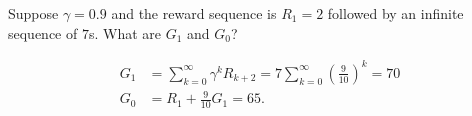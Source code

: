 
\begin{exercise}[Exercise 3.9]

Suppose $\gamma = 0.9$ and the reward sequence is $R_1 =2 $ followed by an infinite
sequence of $7$s. What are $G_1$ and $G_0$?

\end{exercise}


\begin{solution}

\begin{align*}
  G_1 &= \sum_{k=0}^{\infty}\gamma^k R_{k+2} = 7 \sum_{k=0}^{\infty}\left(\frac{9}{10}\right)^k = 70 \\
  G_0 &= R_1 + \frac{9}{10}G_1 = 65.
\end{align*}

\end{solution}


